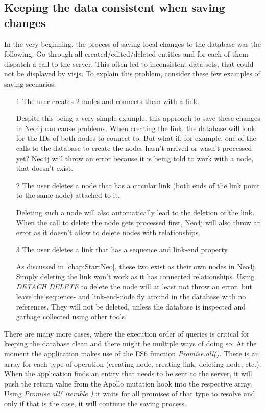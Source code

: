\subsection{Keeping the data consistent when saving changes}
In the very beginning, the process of saving local changes to the database was the following: Go through all created/edited/deleted entities and for each of them dispatch a call to the server. This often led to inconsistent data sets, that could not be displayed by visjs. To explain this problem, consider these few examples of saving scenarios:
\begin{itemize}
\item[1] The user creates 2 nodes and connects them with a link.

Despite this being a very simple example, this approach to save these changes in Neo4j can cause problems. When creating the link, the database will look for the IDs of both nodes to connect to. But what if, for example, one of the calls to the database to create the nodes hasn't arrived or wasn't processed yet? Neo4j will throw an error because it is being told to work with a node, that doesn't exist.

\item[2] The user deletes a node that has a circular link (both ends of the link point to the same node) attached to it.

Deleting such a node will also automatically lead to the deletion of the link. When the call to delete the node gets processed first, Neo4j will also throw an error as it doesn't allow to delete nodes with relationships.

\item[3] The user deletes a link that has a sequence and link-end property.

As discussed in \autoref{chap:StartNeo}, these two exist as their own nodes in Neo4j. Simply deleting the link won't work as it has connected relationships. Using \emph{DETACH DELETE} to delete the node will at least not throw an error, but leave the sequence- and link-end-node fly around in the database with no references. They will not be deleted, unless the database is inspected and garbage collected using other tools.
\end{itemize}

There are many more cases, where the execution order of queries is critical for keeping the database clean and there might be multiple ways of doing so. At the moment the application makes use of the ES6 function \emph{Promise.all()}. There is an array for each type of operation (creating node, creating link, deleting node, etc.). When the application finds an entity that needs to be sent to the server, it will push the return value from the Apollo mutation hook into the respective array. Using \emph{Promise.all( iterable )} it waits for all promises of that type to resolve and only if that is the case, it will continue the saving process.

